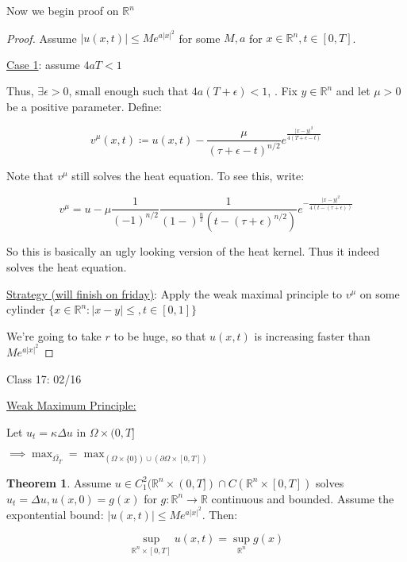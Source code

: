 \documentclass{article}
\theoremstyle{definition}
\newtheorem{theorem}{Theorem}
\begin{document}
Now we begin proof on \(\mathbb{R}^n\) 

\begin{proof}
    Assume \(\vert u(x,t) \vert \leq  M e ^ {a \vert x \vert ^2}\) for some \(M,a\) for \(x\in\mathbb{R}^n, t\in [0,T]\).

    \underline{Case 1}: assume \(4aT < 1\) 
    
    Thus, \(\exists \epsilon > 0\), small enough such that \(4a (T+ \epsilon ) < 1\),
.
    Fix \(y\in\mathbb{R}^n\) and let \(\mu > 0\) be a positive parameter. Define:

    \[
        v^\mu (x,t) \coloneqq u(x,t) - \frac{\mu}{(\tau + \epsilon - t)^{n / 2}} e^\frac{\vert x - y \vert^2}{4 (T+\epsilon -t)}
    \]

    Note that \(v^\mu\) still solves the heat equation. To see this, write:

    \[
        v^\mu = u - \mu \frac{1}{(-1)^{n / 2}} \frac{1}{(1-)^{\frac{n}{2}}(t - (\tau + \epsilon)^{n/2})} e ^ {-\frac{\vert x - y \vert ^2}{4(t - (\tau + \epsilon))}}
    \]

    So this is basically an ugly looking version of the heat kernel. Thus it indeed solves the heat equation.

    \underline{Strategy (will finish on friday)}: Apply the weak maximal principle to \(v^\mu\) on some cylinder \(\{ x\in \mathbb{R}^n : \vert x - y \vert \leq , t\in [0,1] \} \)

    We're going to take \(r\) to be huge, so that \(u(x,t)\) is increasing faster than \(M e ^ {a \vert x \vert ^2}\) 

\end{proof}

\hrulefill

Class 17: 02/16

\underline{Weak Maximum Principle:}

Let \(u_t = \kappa \Delta u\) in \(\Omega \times (0,T]\) 

\(\implies \max_{\overline{\Omega_T}}=\max_{(\Omega \times \{ 0 \} ) \cup (\partial \Omega \times [0,T])}\) 

\begin{theorem}
    Assume \(u\in C^2_1(\mathbb{R}^n\times (0,T])\cap C(\mathbb{R}^n\times [0,T])\) solves \(u_t = \Delta u, u(x,0)=g(x)\) for \(g:\mathbb{R}^n \to \mathbb{R}\) continuous and bounded. Assume the expontential bound: \(\vert u(x,t) \vert \leq M e^{a \vert x \vert ^2}\). Then:

    \[
        \sup_{\mathbb{R}^n \times [0,T]} u(x,t) = \sup_{\mathbb{R}^n} g(x)
    \]
\end{theorem}
\end{document}
